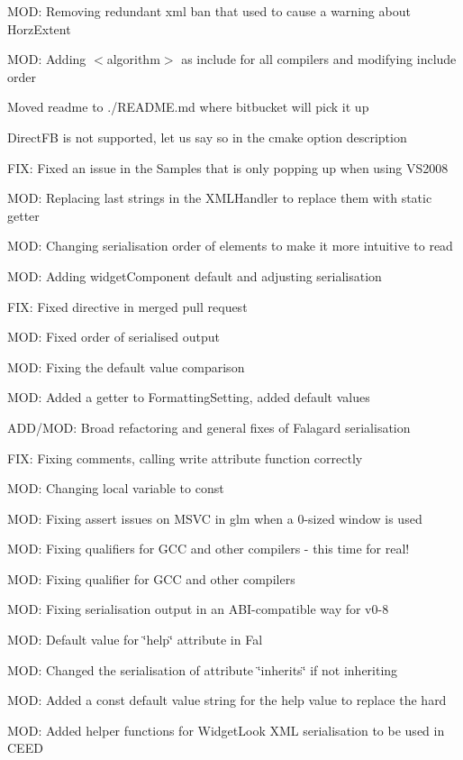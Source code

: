 \begin{DoxyItemize}
\item M\+OD\+: Removing redundant xml ban that used to cause a warning about Horz\+Extent
\item M\+OD\+: Adding $<$algorithm$>$ as include for all compilers and modifying include order
\item Moved readme to ./\+R\+E\+A\+D\+ME.md where bitbucket will pick it up
\item Direct\+FB is not supported, let us say so in the cmake option description
\item F\+IX\+: Fixed an issue in the Samples that is only popping up when using V\+S2008
\item M\+OD\+: Replacing last strings in the X\+M\+L\+Handler to replace them with static getter
\item M\+OD\+: Changing serialisation order of elements to make it more intuitive to read
\item M\+OD\+: Adding widget\+Component default and adjusting serialisation
\item F\+IX\+: Fixed directive in merged pull request
\item M\+OD\+: Fixed order of serialised output
\item M\+OD\+: Fixing the default value comparison
\item M\+OD\+: Added a getter to Formatting\+Setting, added default values
\item A\+D\+D/\+M\+OD\+: Broad refactoring and general fixes of Falagard serialisation
\item F\+IX\+: Fixing comments, calling write attribute function correctly
\item M\+OD\+: Changing local variable to const
\item M\+OD\+: Fixing assert issues on M\+S\+VC in glm when a 0-\/sized window is used
\item M\+OD\+: Fixing qualifiers for G\+CC and other compilers -\/ this time for real!
\item M\+OD\+: Fixing qualifier for G\+CC and other compilers
\item M\+OD\+: Fixing serialisation output in an A\+B\+I-\/compatible way for v0-\/8
\item M\+OD\+: Default value for \char`\"{}help\char`\"{} attribute in Fal
\item M\+OD\+: Changed the serialisation of attribute \char`\"{}inherits\char`\"{} if not inheriting
\item M\+OD\+: Added a const default value string for the help value to replace the hard
\item M\+OD\+: Added helper functions for Widget\+Look X\+ML serialisation to be used in C\+E\+ED

\end{DoxyItemize}
